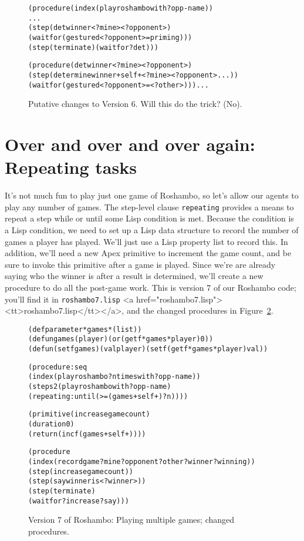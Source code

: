 \documentclass[12pt]{article}
\newcommand{\ic}{\texttt}
\newenvironment{code}%
   {\begin{alltt}}%
   {\end{alltt}}
\newenvironment{float}%
   {\begin{center}}%
   {\end{center}
   }
\newcommand{\fn}[1]{\texonly\texttt{#1}\endtexonly
  \htmlonly \rawhtml <a href="#1"><tt>#1</tt></a>\endrawhtml \endhtmlonly}
\begin{document}
\begin{figure}
\begin{float}
\begin{code}
(procedure (index (play roshambo with ?opp-name))
  ... 
  (step (det winner <?mine> <?opponent>)
   (waitfor (gestured <?opponent> = priming)))
  (step (terminate) (waitfor ?det)))

(procedure (det winner <?mine> <?opponent>)
  (step (determine winner +self+ <?mine> <?opponent> ...))
   (waitfor (gestured <?opponent> = <?other>))) ...
\end{code}
\end{float}
\caption{Putative changes to Version 6. Will this do the trick? (No).\label{fig.roshambo.6.poss.fix}}
\end{figure}

\htmlpagebreak
\section{Over and over and over again: Repeating tasks}

It's not much fun to play just one game of Roshambo, so let's allow our agents to play any number of games. The step-level clause \ic{repeating} provides a means to repeat a step while or until some Lisp condition is met. Because the condition is a Lisp condition, we need to set up a Lisp data structure to record the number of games a player has played. We'll just use a Lisp property list to record this. In addition, we'll need a new Apex primitive to increment the game count, and be sure to invoke this primitive after a game is played. Since we're are already saying who the winner is after a result is determined, we'll create a new procedure to do all the post-game work. This is version 7 of our Roshambo code; you'll find it in \fn{roshambo7.lisp}, and the changed procedures in Figure~\ref{fig.roshambo.7}.

\begin{figure}
\begin{float}
\begin{code}
(defparameter *games* (list))
(defun games (player) (or (getf *games* player) 0))
(defun (setf games) (val player) (setf (getf *games* player) val))

(procedure :seq
  (index (play roshambo ?n times with ?opp-name))
  (step s2 (play roshambo with ?opp-name)
    (repeating :until (>= (games +self+) ?n))))

(primitive (increase game count) 
  (duration 0)
  (return (incf (games +self+))))

(procedure 
  (index (record game ?mine ?opponent ?other ?winner ?winning))
  (step (increase game count))
  (step (say winner is <?winner>))
  (step (terminate)
    (waitfor ?increase ?say)))
\end{code}
\end{float}
\caption{Version 7 of Roshambo: Playing multiple games; changed procedures.\label{fig.roshambo.7}}
\end{figure}
\end{document}
